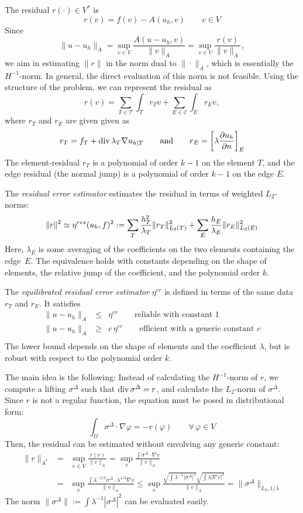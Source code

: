 \qquad

The residual $r(\cdot) \in V^*$ is 
$$
r(v) = f(v) - A(u_h, v) \qquad v \in V
$$
Since 
$$
\| u - u_h \|_A = \sup_{v \in V} \frac{A(u-u_h, v)}{\| v \|_A} = 
 \sup_{v \in V} \frac { r(v) }{\| v \|_A},
$$
we aim in estimating $\|r \|$ in the norm dual to $\| \cdot \|_A$, which is essentially the $H^{-1}$-norm. In general, the direct evaluation of this norm is not feasible.
Using the structure of the problem, we can represent the residual as
$$
r(v) = \sum_{T \in \mathcal{T}} \int_T r_T v + \sum_{E \in \mathcal{E}} \int_E r_E v,
$$
where $r_T$ and $r_E$ are given given as
$$
r_T = f_T + \operatorname{div} \lambda_T \nabla u_{h|T}  \qquad \text{and} \qquad
r_E = \left[  \lambda \frac{\partial u_h} {\partial n}  \right]_E
$$
The element-residual $r_T$ is a polynomial of order $k-1$ on the element $T$, and the edge residual (the normal jump) is a polynomial of order $k-1$ on the edge $E$. 

The {\em residual error estimator} estimates the residual in terms of weighted $L_2$-norms:
$$
\| r \|^2 \simeq \eta^{res}(u_h, f)^2 := \sum_T \frac{ h_T^2}{\lambda_T}  \| r_T \|_{L_2(T)}^2 + \sum_E \frac{ h_E }{\lambda_E} \| r_E \|_{L_2(E)}^2
$$
Here, $\lambda_E$ is some averaging of the coefficients on the two elements containing the edge~$E$. The equivalence holds with constants depending on the shape of elements, the relative jump of the coefficient, and the polynomial order $k$.


The {\em equilibrated residual error estimator} $\eta^{er}$ is defined in terms of the same data $r_T$ and $r_E$. It satisfies
\begin{eqnarray*}
\| u - u_h \|_A & \leq & \eta^{er} \qquad \text{reliable with constant 1} \\
\| u - u_h \|_A & \geq & c \, \eta^{er} \qquad \text{efficient with a generic constant $c$} \\
\end{eqnarray*}
The lower bound depends on the shape of elements and the coefficient $\lambda$, but is robust with respect to the polynomial order $k$.

The main idea is the following: Instead of calculating the $H^{-1}$-norm of $r$, we compute a lifting $\sigma^\Delta$ such that $\operatorname{div} \sigma^\Delta = r$, and calculate the $L_2$-norm of $\sigma^\Delta$. Since $r$ is not a regular function, the equation must be posed in distributional form:
$$
\int_\Omega \sigma^\Delta \cdot \nabla \varphi = - r(\varphi) \qquad \forall \, \varphi \in V
$$
Then, the residual can be estimated without envolving any generic constant:
\begin{eqnarray*}
\| r \|_{A^\ast} & = & \sup_{v \in V} \frac{r(v)}{\| v \|_A} = \sup_v \frac{\int \sigma^\Delta \cdot \nabla v }{\|v \|_A} \\
&= & \sup_v \frac{\int \lambda^{-1/2} \sigma^\Delta \cdot \lambda^{1/2} \nabla v }{\|v \|_A}
\leq \sup_v \frac{\sqrt{\int \lambda^{-1} |\sigma^\Delta|^2}  \sqrt{ \int \lambda |\nabla v|^2 } }{\|v \|_A}
= \| \sigma^\Delta \|_{L_2, 1/\lambda}
\end{eqnarray*}
The norm $\| \sigma^\Delta \| := \int \lambda^{-1} | \sigma^\Delta|^2$ can be evaluated easily. 

